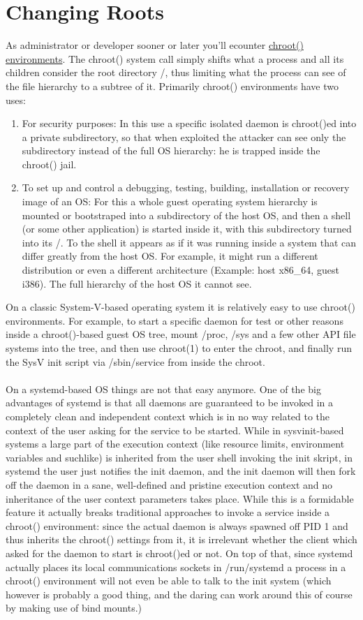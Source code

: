 \documentclass[titlepage]{article}
\begin{document}
\section{Changing Roots}
As administrator or developer sooner or later you'll ecounter \href{http://linux.die.net/man/1/chroot}{chroot() environments}. The chroot() system call simply shifts what a process and all its children consider the root directory /, thus limiting what the process can see of the file hierarchy to a subtree of it. Primarily chroot() environments have two uses:
\begin{enumerate}
\item
For security purposes: In this use a specific isolated daemon is chroot()ed into a private subdirectory, so that when exploited the attacker can see only the subdirectory instead of the full OS hierarchy: he is trapped inside the chroot() jail.
\item
To set up and control a debugging, testing, building, installation or recovery image of an OS: For this a whole guest operating system hierarchy is mounted or bootstraped into a subdirectory of the host OS, and then a shell (or some other application) is started inside it, with this subdirectory turned into its /. To the shell it appears as if it was running inside a system that can differ greatly from the host OS. For example, it might run a different distribution or even a different architecture (Example: host x86\_64, guest i386). The full hierarchy of the host OS it cannot see.
\end{enumerate}
On a classic System-V-based operating system it is relatively easy to use chroot() environments. For example, to start a specific daemon for test or other reasons inside a chroot()-based guest OS tree, mount /proc, /sys and a few other API file systems into the tree, and then use chroot(1) to enter the chroot, and finally run the SysV init script via /sbin/service from inside the chroot.
\\
\\
On a systemd-based OS things are not that easy anymore. One of the big advantages of systemd is that all daemons are guaranteed to be invoked in a completely clean and independent context which is in no way related to the context of the user asking for the service to be started. While in sysvinit-based systems a large part of the execution context (like resource limits, environment variables and suchlike) is inherited from the user shell invoking the init skript, in systemd the user just notifies the init daemon, and the init daemon will then fork off the daemon in a sane, well-defined and pristine execution context and no inheritance of the user context parameters takes place. While this is a formidable feature it actually breaks traditional approaches to invoke a service inside a chroot() environment: since the actual daemon is always spawned off PID 1 and thus inherits the chroot() settings from it, it is irrelevant whether the client which asked for the daemon to start is chroot()ed or not. On top of that, since systemd actually places its local communications sockets in /run/systemd a process in a chroot() environment will not even be able to talk to the init system (which however is probably a good thing, and the daring can work around this of course by making use of bind mounts.)
\end{document}
